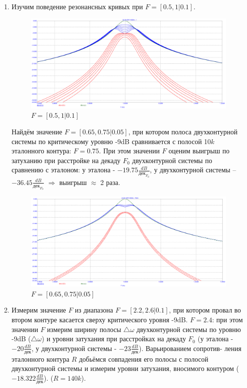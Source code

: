 \documentclass[a4paper, 12pt]{article}%
\begin{document}
\begin{enumerate}
\newpage

\item Изучим поведение резонансных кривых при $F = [0.5, 1 | 0.1]$. 

\begin{figure}[h!]
\centering
\includegraphics[scale = 0.4]{images/plot6_1.png}
\caption{$F = [0.5, 1 | 0.1]$}
\label{fig:Image1}
\end{figure}

Найдём значение $F = [0.65, 0.75 | 0.05]$, при котором полоса двухконтурной системы по критическому уровню -9dB сравнивается с полосой 10$k$ эталонного контура: $F = 0.75$. При этом значении $F$ оценим выигрыш по затуханию при расстройке на декаду $F_0$ двухконтурной системы по сравнению с эталоном: у эталона - $-19.75 \frac{dB}{\text{дек}_{F_0}}$, у двухконтурной системы – $-36.45 \frac{dB}{\text{дек}_{F_0}}$ $\Longrightarrow$ выигрыш $\approx$ 2 раза.

\begin{figure}[h!]
\centering
\includegraphics[scale = 0.4]{images/plot6_2.png}
\caption{$F = [0.65, 0.75 | 0.05]$}
\label{fig:Image1}
\end{figure}

\newpage

\item Измерим значение $F$ из диапазона $F = [2.2, 2.6 | 0.1]$, при котором провал во втором контуре касается сверху критического уровня -9dB. 
$F = 2.4$: при этом значении $F$ измерим ширину полосы $\bigtriangleup\omega$ двухконтурной системы по уровню -9dB ($\bigtriangleup \omega$) и уровни затухания при расстройках на декаду $F_0$ (у эталона - $-20 \frac{dB}{\text{дек}}$, у двухконтурной системы - $-23 \frac{dB}{\text{дек}}$). Варьированием сопротив-
ления эталонного контура $R$ добьёмся совпадения его полосы с полосой двухконтурной системы и измерим уровни затухания, вносимого контуром ($-18.322 \frac{dB}{\text{дек}}$). ($R = 140k$).


\end{enumerate}
\end{document}
